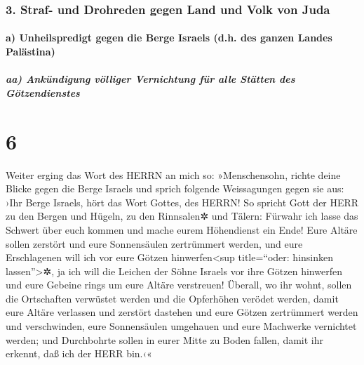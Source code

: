 \hypertarget{straf--und-drohreden-gegen-land-und-volk-von-juda}{%
\subsubsection{3. Straf- und Drohreden gegen Land und Volk von
Juda}\label{straf--und-drohreden-gegen-land-und-volk-von-juda}}

\hypertarget{a-unheilspredigt-gegen-die-berge-israels-d.h.-des-ganzen-landes-paluxe4stina}{%
\paragraph{a) Unheilspredigt gegen die Berge Israels (d.h. des ganzen
Landes
Palästina)}\label{a-unheilspredigt-gegen-die-berge-israels-d.h.-des-ganzen-landes-paluxe4stina}}

\hypertarget{aa-ankuxfcndigung-vuxf6lliger-vernichtung-fuxfcr-alle-stuxe4tten-des-guxf6tzendienstes}{%
\subparagraph{aa) Ankündigung völliger Vernichtung für alle Stätten des
Götzendienstes}\label{aa-ankuxfcndigung-vuxf6lliger-vernichtung-fuxfcr-alle-stuxe4tten-des-guxf6tzendienstes}}

\hypertarget{section-5}{%
\section{6}\label{section-5}}

Weiter erging das Wort des HERRN an mich so:
»Menschensohn, richte deine Blicke gegen die Berge Israels
und sprich folgende Weissagungen gegen sie aus: ›Ihr Berge
Israels, hört das Wort Gottes, des HERRN! So spricht Gott der HERR zu
den Bergen und Hügeln, zu den Rinnsalen✲ und Tälern: Fürwahr ich lasse
das Schwert über euch kommen und mache eurem Höhendienst ein Ende!
Eure Altäre sollen zerstört und eure Sonnensäulen
zertrümmert werden, und eure Erschlagenen will ich vor eure Götzen
hinwerfen\textless sup title=``oder: hinsinken lassen''\textgreater✲,
ja ich will die Leichen der Söhne Israels vor ihre Götzen
hinwerfen und eure Gebeine rings um eure Altäre verstreuen!
Überall, wo ihr wohnt, sollen die Ortschaften verwüstet
werden und die Opferhöhen verödet werden, damit eure Altäre verlassen
und zerstört dastehen und eure Götzen zertrümmert werden und
verschwinden, eure Sonnensäulen umgehauen und eure Machwerke vernichtet
werden; und Durchbohrte sollen in eurer Mitte zu Boden
fallen, damit ihr erkennt, daß ich der HERR bin.‹«

